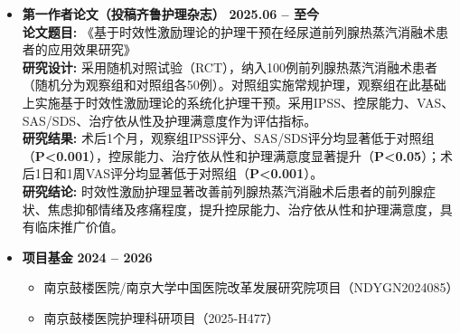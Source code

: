\documentclass[zh]{resume}
\begin{document}
\begin{itemize}
        \item
        \textbf{第一作者论文（投稿齐鲁护理杂志）} \hfill \textbf{2025.06 -- 至今}
          \\
        \textbf{论文题目: } 《基于时效性激励理论的护理干预在经尿道前列腺热蒸汽消融术患者的应用效果研究》
        \\
        \textbf{研究设计: } 采用随机对照试验（RCT），纳入100例前列腺热蒸汽消融术患者（随机分为观察组和对照组各50例）。对照组实施常规护理，观察组在此基础上实施基于时效性激励理论的系统化护理干预。采用IPSS、控尿能力、VAS、SAS/SDS、治疗依从性及护理满意度作为评估指标。
        \\
        \textbf{研究结果: } 术后1个月，观察组IPSS评分、SAS/SDS评分均显著低于对照组（\textbf{P<0.001}），控尿能力、治疗依从性和护理满意度显著提升（\textbf{P<0.05}）；术后1日和1周VAS评分均显著低于对照组（\textbf{P<0.001}）。
        \\
        \textbf{研究结论: } 时效性激励护理显著改善前列腺热蒸汽消融术后患者的前列腺症状、焦虑抑郁情绪及疼痛程度，提升控尿能力、治疗依从性和护理满意度，具有临床推广价值。

        \item
        \textbf{项目基金} \hfill \textbf{2024 -- 2026}
        \begin{itemize}
            \item 南京鼓楼医院/南京大学中国医院改革发展研究院项目（NDYGN2024085）
            \item 南京鼓楼医院护理科研项目（2025-H477）
        \end{itemize}
\end{itemize}


\end{document}
